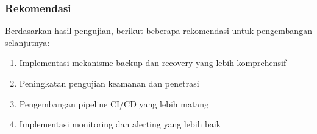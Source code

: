 \subsubsection{Rekomendasi}
Berdasarkan hasil pengujian, berikut beberapa rekomendasi untuk pengembangan
selanjutnya:
\begin{enumerate}
  \item Implementasi mekanisme backup dan recovery yang lebih komprehensif
  \item Peningkatan pengujian keamanan dan penetrasi
  \item Pengembangan pipeline CI/CD yang lebih matang
  \item Implementasi monitoring dan alerting yang lebih baik
\end{enumerate}



